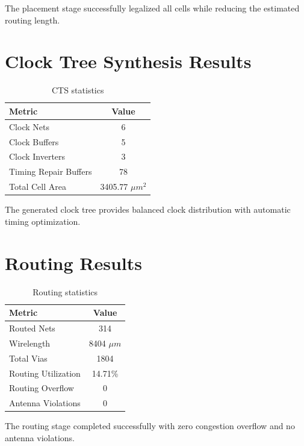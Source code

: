 The placement stage successfully legalized all cells while reducing the estimated routing length.


\section{Clock Tree Synthesis Results}

\begin{table}[H]
\centering
\caption{CTS statistics}
\label{tab:cts_result}
\begin{tabular}{lc}
\toprule
Metric & Value\\
\midrule
Clock Nets & 6\\
Clock Buffers & 5\\
Clock Inverters & 3\\
Timing Repair Buffers & 78\\
Total Cell Area & 3405.77 $\mu m^2$\\
\bottomrule
\end{tabular}
\end{table}

The generated clock tree provides balanced clock distribution with automatic timing optimization.


\section{Routing Results}

\begin{table}[!htbp]
\centering
\caption{Routing statistics}
\label{tab:routing_result}
\begin{tabular}{lc}
\toprule
Metric & Value\\
\midrule
Routed Nets & 314\\
Wirelength & 8404 $\mu m$\\
Total Vias & 1804\\
Routing Utilization & 14.71\%\\
Routing Overflow & 0\\
Antenna Violations & 0\\
\bottomrule
\end{tabular}
\end{table}

The routing stage completed successfully with zero congestion overflow and no antenna violations.

